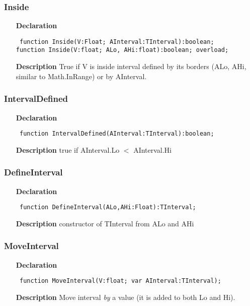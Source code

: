 \documentclass[12pt,a4paper,oneside]{report}
\newcommand{\declarationitem}[1]{\textbf{#1}}
\newcommand{\descriptiontitle}[1]{\textbf{#1}}
\newcommand{\code}[1]{\texttt{#1}}
\begin{document}
\subsubsection{Inside}
\label{uIntervals-Inside}
\begin{itemize}\item[\declarationitem{Declaration}\hfill]
\begin{flushleft}
\code{
function Inside(V:Float; AInterval:TInterval):boolean;\\
function Inside(V:float; ALo, AHi:float):boolean; overload;}
\end{flushleft}
\item[\descriptiontitle{Description}]
True if V is inside interval defined by its borders (ALo, AHi, similar to Math.InRange) or by AInterval.
\end{itemize}

\subsubsection{IntervalDefined}
\label{uIntervals-IntervalDefined}
\begin{itemize}\item[\declarationitem{Declaration}\hfill]
\begin{flushleft}
\code{
function IntervalDefined(AInterval:TInterval):boolean;}
\end{flushleft}

\item[\descriptiontitle{Description}]
true if AInterval.Lo {$<$} AInterval.Hi
\end{itemize}

\subsubsection{DefineInterval}
\label{uIntervals-DefineInterval}
\begin{itemize}\item[\declarationitem{Declaration}\hfill]
\begin{flushleft}
\code{
function DefineInterval(ALo,AHi:Float):TInterval;}
\end{flushleft}
\item[\descriptiontitle{Description}]
constructor of TInterval from ALo and AHi
\end{itemize}

\subsubsection{MoveInterval}
\label{uIntervals-MoveInterval}
\begin{itemize}\item[\declarationitem{Declaration}\hfill]
	\begin{flushleft}
		\code{
			function MoveInterval(V:float; var AInterval:TInterval);}
	\end{flushleft}
	\item[\descriptiontitle{Description}]
	Move interval \textit{by} a value (it is added to both Lo and Hi).
\end{itemize}
\end{document}
